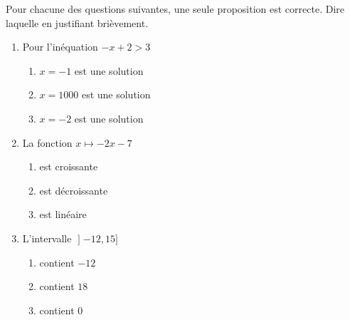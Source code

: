
\begin{exercice}\label{exosmath-0519}

    Pour chacune des questions suivantes, une seule proposition est correcte. Dire laquelle en justifiant brièvement.

    \begin{multicols}{2}
    \begin{enumerate}
        \item
        Pour l'inéquation \( -x+2>3\)
        \begin{enumerate}
            \item
                
        \( x=-1\) est une solution\item\( x=1000\) est une solution\item\( x=-2\) est une solution \\
        \end{enumerate}
    \item 
        La fonction \( x\mapsto -2x-7\)
        \begin{enumerate}
                
            \item est croissante\item est décroissante\item est linéaire\\
        \end{enumerate}
    \item
        L'intervalle \( \mathopen] -12 , 15 \mathclose]\)
        \begin{enumerate}
                
    \item contient \( -12\)\item contient \( 18\)\item contient \( 0\)\\
        \end{enumerate}
            
    \end{enumerate}
    \end{multicols}

\end{exercice}
